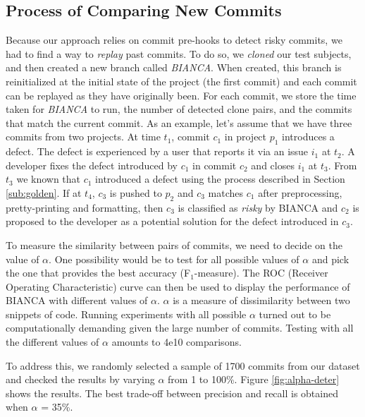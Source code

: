\documentclass[12pt]{report}
\begin{document}
\subsection{Process of Comparing New Commits}\label{sec:newcommits}

Because our approach relies on commit pre-hooks to detect risky commits,
we had to find a way to \emph{replay} past commits. To do so, we
\emph{cloned} our test subjects, and then created a new branch called
\emph{BIANCA}. When created, this branch is reinitialized at the initial
state of the project (the first commit) and each commit can be replayed
as they have originally been. For each commit, we store the time taken
for \emph{BIANCA} to run, the number of detected clone pairs, and the
commits that match the current commit. As an example, let's assume that
we have three commits from two projects. At time \(t_1\), commit \(c_1\)
in project \(p_1\) introduces a defect. The defect is experienced by a
user that reports it via an issue \(i_1\) at \(t_2\). A developer fixes
the defect introduced by \(c_1\) in commit \(c_2\) and closes \(i_1\) at
\(t_3\). From \(t_3\) we known that \(c_1\) introduced a defect using
the process described in Section \ref{sub:golden}. If at \(t_4\),
\(c_3\) is pushed to \(p_2\) and \(c_3\) matches \(c_1\) after
preprocessing, pretty-printing and formatting, then \(c_3\) is
classified as \emph{risky} by BIANCA and \(c_2\) is proposed to the
developer as a potential solution for the defect introduced in \(c_3\).



To measure the similarity between pairs of commits, we need to decide on
the value of \(\alpha\). One possibility would be to test for all
possible values of \(\alpha\) and pick the one that provides the best
accuracy (F\(_1\)-measure). The ROC (Receiver Operating Characteristic)
curve can then be used to display the performance of BIANCA with
different values of \(\alpha\). \(\alpha\) is a measure of dissimilarity
between two snippets of code. Running experiments with all possible
\(\alpha\) turned out to be computationally demanding given the large
number of commits. Testing with all the different values of \(\alpha\)
amounts to 4e10 comparisons.

To address this, we randomly selected a sample of 1700 commits from our
dataset and checked the results by varying \(\alpha\) from 1 to 100\%.
Figure \ref{fig:alpha-deter} shows the results. The best trade-off
between precision and recall is obtained when \(\alpha\) = 35\%.
\end{document}
